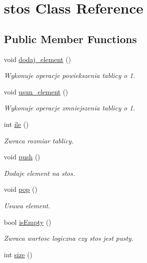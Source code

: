 \hypertarget{classstos}{\section{stos \-Class \-Reference}
\label{classstos}
}
\subsection*{\-Public \-Member \-Functions}
\begin{DoxyCompactItemize}
\item 
void \hyperlink{classstos_acdee2cf8945a740d5ccf0853d4509cf3}{dodaj\-\_\-element} ()
\begin{DoxyCompactList}\small\item\em \-Wykonuje operacje powiekszenia tablicy o 1. \end{DoxyCompactList}\item 
void \hyperlink{classstos_ad4e9a160e50c6f44e96a89ec6070de50}{usun\-\_\-element} ()
\begin{DoxyCompactList}\small\item\em \-Wykonuje operacje zmniejszenia tablicy o 1. \end{DoxyCompactList}\item 
int \hyperlink{classstos_ae62c0be57f267e95c67f2270bb995ce1}{ile} ()
\begin{DoxyCompactList}\small\item\em \-Zwraca rozmiar tablicy. \end{DoxyCompactList}\item 
void \hyperlink{classstos_a2c5ab42214958b89622f9081b448eeea}{push} ()
\begin{DoxyCompactList}\small\item\em \-Dodaje element na stos. \end{DoxyCompactList}\item 
void \hyperlink{classstos_a1ea3871017a605bcbe3645a93d23b752}{pop} ()
\begin{DoxyCompactList}\small\item\em \-Usuwa element. \end{DoxyCompactList}\item 
bool \hyperlink{classstos_a9bc121b354b59a2632e9ffbf4b9b02a9}{is\-Empty} ()
\begin{DoxyCompactList}\small\item\em \-Zwraca wartosc logiczna czy stos jest pusty. \end{DoxyCompactList}\item 
int \hyperlink{classstos_a47fcfe525e580ceb48080b33ab3d53de}{size} ()

\end{DoxyCompactItemize}
